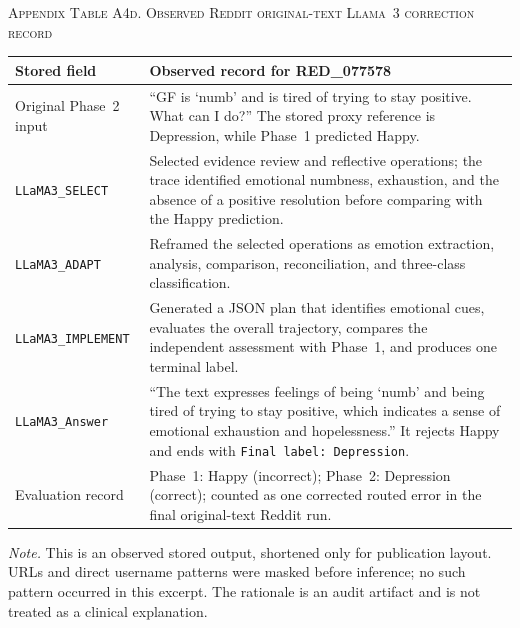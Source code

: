 \documentclass{ieeeaccess}
\begin{document}
\par\medskip
\noindent\textsc{Appendix Table A4d. Observed Reddit original-text Llama~3 correction record}\par
\label{tab:appendix-a4d-reddit-original-correction}
\smallskip
\footnotesize
\setlength{\tabcolsep}{3.5pt}
\renewcommand{\arraystretch}{1.15}
\noindent\begin{tabularx}{\textwidth}{@{}>{\raggedright\arraybackslash}p{}Y@{}}
\toprule
Stored field & Observed record for RED\_077578 \\
\midrule
Original Phase~2 input & ``GF is `numb' and is tired of trying to stay positive. What can I do?'' The stored proxy reference is Depression, while Phase~1 predicted Happy. \\
\texttt{LLaMA3\_SELECT} & Selected evidence review and reflective operations; the trace identified emotional numbness, exhaustion, and the absence of a positive resolution before comparing with the Happy prediction. \\
\texttt{LLaMA3\_ADAPT} & Reframed the selected operations as emotion extraction, analysis, comparison, reconciliation, and three-class classification. \\
\texttt{LLaMA3\_IMPLEMENT} & Generated a JSON plan that identifies emotional cues, evaluates the overall trajectory, compares the independent assessment with Phase~1, and produces one terminal label. \\
\texttt{LLaMA3\_Answer} & ``The text expresses feelings of being `numb' and being tired of trying to stay positive, which indicates a sense of emotional exhaustion and hopelessness.'' It rejects Happy and ends with \texttt{Final label: Depression}. \\
Evaluation record & Phase~1: Happy (incorrect); Phase~2: Depression (correct); counted as one corrected routed error in the final original-text Reddit run. \\
\bottomrule
\end{tabularx}
\par\smallskip
\noindent\footnotesize\textit{Note.} This is an observed stored output, shortened only for publication layout. URLs and direct username patterns were masked before inference; no such pattern occurred in this excerpt. The rationale is an audit artifact and is not treated as a clinical explanation.\normalsize
\end{document}
